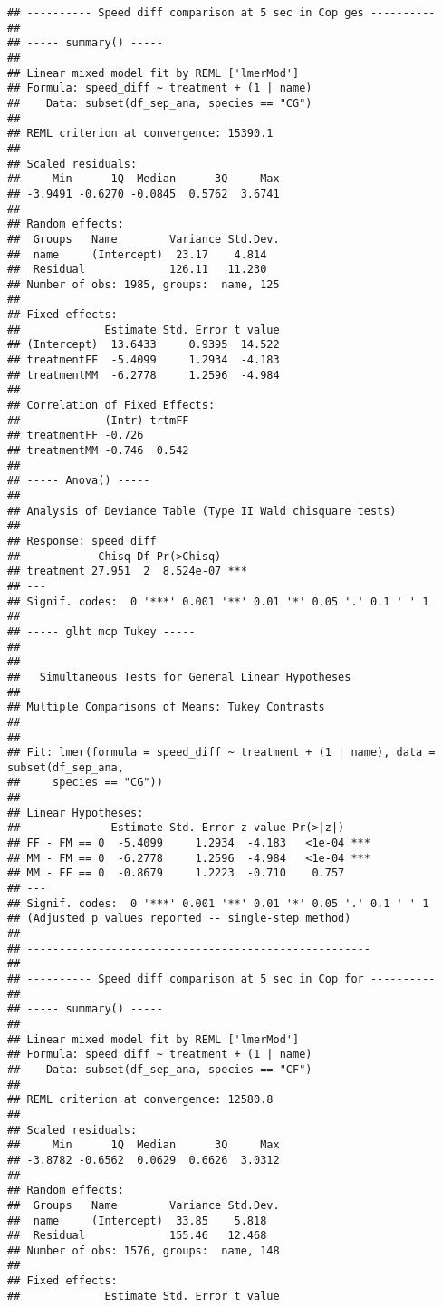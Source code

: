 \documentclass[
]{article}
\begin{document}
\begin{verbatim}
## ---------- Speed diff comparison at 5 sec in Cop ges ----------
## 
## ----- summary() -----
## 
## Linear mixed model fit by REML ['lmerMod']
## Formula: speed_diff ~ treatment + (1 | name)
##    Data: subset(df_sep_ana, species == "CG")
## 
## REML criterion at convergence: 15390.1
## 
## Scaled residuals: 
##     Min      1Q  Median      3Q     Max 
## -3.9491 -0.6270 -0.0845  0.5762  3.6741 
## 
## Random effects:
##  Groups   Name        Variance Std.Dev.
##  name     (Intercept)  23.17    4.814  
##  Residual             126.11   11.230  
## Number of obs: 1985, groups:  name, 125
## 
## Fixed effects:
##             Estimate Std. Error t value
## (Intercept)  13.6433     0.9395  14.522
## treatmentFF  -5.4099     1.2934  -4.183
## treatmentMM  -6.2778     1.2596  -4.984
## 
## Correlation of Fixed Effects:
##             (Intr) trtmFF
## treatmentFF -0.726       
## treatmentMM -0.746  0.542
## 
## ----- Anova() -----
## 
## Analysis of Deviance Table (Type II Wald chisquare tests)
## 
## Response: speed_diff
##            Chisq Df Pr(>Chisq)    
## treatment 27.951  2  8.524e-07 ***
## ---
## Signif. codes:  0 '***' 0.001 '**' 0.01 '*' 0.05 '.' 0.1 ' ' 1
## 
## ----- glht mcp Tukey -----
## 
## 
##   Simultaneous Tests for General Linear Hypotheses
## 
## Multiple Comparisons of Means: Tukey Contrasts
## 
## 
## Fit: lmer(formula = speed_diff ~ treatment + (1 | name), data = subset(df_sep_ana, 
##     species == "CG"))
## 
## Linear Hypotheses:
##              Estimate Std. Error z value Pr(>|z|)    
## FF - FM == 0  -5.4099     1.2934  -4.183   <1e-04 ***
## MM - FM == 0  -6.2778     1.2596  -4.984   <1e-04 ***
## MM - FF == 0  -0.8679     1.2223  -0.710    0.757    
## ---
## Signif. codes:  0 '***' 0.001 '**' 0.01 '*' 0.05 '.' 0.1 ' ' 1
## (Adjusted p values reported -- single-step method)
## 
## -----------------------------------------------------
## 
## ---------- Speed diff comparison at 5 sec in Cop for ----------
## 
## ----- summary() -----
## 
## Linear mixed model fit by REML ['lmerMod']
## Formula: speed_diff ~ treatment + (1 | name)
##    Data: subset(df_sep_ana, species == "CF")
## 
## REML criterion at convergence: 12580.8
## 
## Scaled residuals: 
##     Min      1Q  Median      3Q     Max 
## -3.8782 -0.6562  0.0629  0.6626  3.0312 
## 
## Random effects:
##  Groups   Name        Variance Std.Dev.
##  name     (Intercept)  33.85    5.818  
##  Residual             155.46   12.468  
## Number of obs: 1576, groups:  name, 148
## 
## Fixed effects:
##             Estimate Std. Error t value

\end{verbatim}
\end{document}
